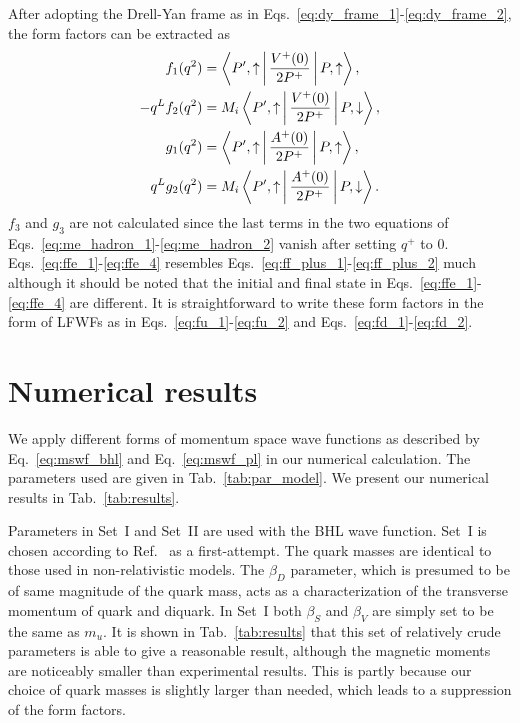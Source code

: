 \documentclass[aps,prc,preprint,groupedaddress,showpacs,superscriptaddress,floatfix]{revtex4-1}
\begin{document}
After adopting the Drell-Yan frame as in Eqs.~\eqref{eq:dy_frame_1}-\eqref{eq:dy_frame_2}, the form factors can be extracted as
%
\begin{align}
  f_1(q^2) &= \Braket{P', \uparrow | \frac{V^+(0)}{2P^+} | P, \uparrow}, \label{eq:ffe_1}\\
  -q^L f_2(q^2) &= M_i \Braket{P', \uparrow | \frac{V^+(0)}{2P^+} | P, \downarrow}, \label{eq:ffe_2}\\
  g_1(q^2) &= \Braket{P', \uparrow | \frac{A^+(0)}{2P^+} | P, \uparrow}, \label{eq:ffe_3}\\
  q^L g_2(q^2) &= M_i \Braket{P', \uparrow | \frac{A^+(0)}{2P^+} | P, \downarrow}. \label{eq:ffe_4}
\end{align}
%
$f_3$ and $g_3$ are not calculated since the last terms in the two equations of Eqs.~\eqref{eq:me_hadron_1}-\eqref{eq:me_hadron_2} vanish after setting $q^+$ to $0$.
Eqs.~\eqref{eq:ffe_1}-\eqref{eq:ffe_4} resembles Eqs.~\eqref{eq:ff_plus_1}-\eqref{eq:ff_plus_2} much although it should be noted that the initial and final state in Eqs.~\eqref{eq:ffe_1}-\eqref{eq:ffe_4} are different. It is straightforward to write these form factors in the form of LFWFs as in Eqs.~\eqref{eq:fu_1}-\eqref{eq:fu_2} and Eqs.~\eqref{eq:fd_1}-\eqref{eq:fd_2}.

\section{Numerical results\label{sec:numerical}}
We apply different forms of momentum space wave functions as described by Eq.~\eqref{eq:mswf_bhl} and Eq.~\eqref{eq:mswf_pl} in our numerical calculation.
The parameters used are given in Tab.~\ref{tab:par_model}.
We present our numerical results in Tab.~\ref{tab:results}.

Parameters in Set~I and Set~II are used with the BHL wave function. Set~I is chosen according to Ref.~\cite{ma_flavor_2000} as a first-attempt.
The quark masses are identical to those used in non-relativistic models.
The $\beta_D$ parameter, which is presumed to be of same magnitude of the quark mass, acts as a characterization of the transverse momentum of quark and diquark.
In Set~I both $\beta_S$ and $\beta_V$ are simply set to be the same as $m_u$.
It is shown in Tab.~\ref{tab:results} that this set of relatively crude parameters is able to give a reasonable result, although the magnetic moments are noticeably smaller than experimental results.
This is partly because our choice of quark masses is slightly larger than needed, which leads to a suppression of the form factors.
\end{document}
